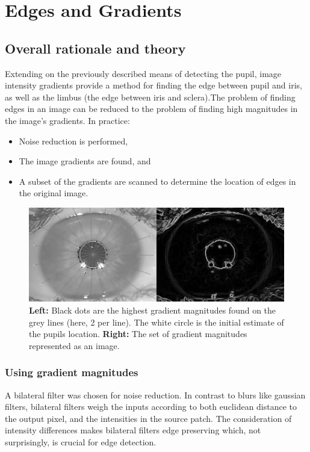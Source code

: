 \pagebreak
\section{Edges and Gradients}
\subsection{Overall rationale and theory}
Extending on the previously described means of detecting the pupil, image
intensity gradients provide a method for finding the edge between pupil and
iris, as well as the limbus (the edge between iris and sclera).The problem of
finding edges in an image can be reduced to the problem of finding high
magnitudes in the image's gradients.
In practice:
\begin{itemize}
	\item Noise reduction is performed,
	\item The image gradients are found, and
	\item A subset of the gradients are scanned to determine the location of edges in the
original image.
\end{itemize}

\begin{figure}[htbp]
\includegraphics{pics/normallines_with_maxima_vs_gradient.png}
\caption{\textbf{Left:} Black dots are the highest gradient magnitudes found on the grey
lines (here, 2 per line). The white circle is the initial estimate of the
pupils location. \textbf{Right:} The set of gradient magnitudes represented as an image.}
\end{figure}

\subsubsection{Using gradient magnitudes}
A bilateral filter was chosen for noise reduction. In contrast to blurs like
gaussian filters, bilateral filters weigh the inputs according to both
euclidean distance to the output pixel, and the intensities in the source
patch. The consideration of intensity differences makes bilateral filters edge
preserving which, not surprisingly, is crucial for edge detection.

